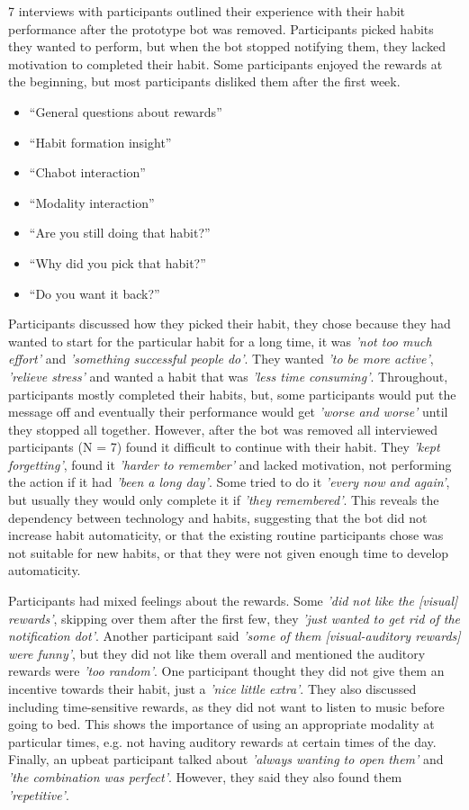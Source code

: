 7 interviews with participants outlined their experience with their habit performance after the prototype bot was removed. Participants picked habits they wanted to perform, but when the bot stopped notifying them, they lacked motivation to completed their habit. Some participants enjoyed the rewards at the beginning, but most participants disliked them after the first week.

\begin{itemize}
  \item ``General questions about rewards''
  \item ``Habit formation insight''
  \item ``Chabot interaction''
  \item ``Modality interaction''
  \item ``Are you still doing that habit?''
  \item ``Why did you pick that habit?''
  \item ``Do you want it back?''
\end{itemize}


Participants discussed how they picked their habit, they chose because they had wanted to start for the particular habit for a long time, it was \textit{'not too much effort'} and \textit{'something successful people do'}. They wanted \textit{'to be more active'}, \textit{'relieve stress'} and wanted a habit that was \textit{'less time consuming'}. Throughout, participants mostly completed their habits, but, some participants would put the message off and eventually their performance would get \textit{'worse and worse'} until they stopped all together. However, after the bot was removed all interviewed participants (N = 7) found it difficult to continue with their habit. They \textit{'kept forgetting'}, found it \textit{'harder to remember'} and lacked motivation, not performing the action if it had \textit{'been a long day'}. Some tried to do it \textit{'every now and again'}, but usually they would only complete it if \textit{'they remembered'}. This reveals the dependency between technology and habits, suggesting that the bot did not increase habit automaticity, or that the existing routine participants chose was not suitable for new habits, or that they were not given enough time to develop automaticity.

Participants had mixed feelings about the rewards. Some \textit{'did not like the [visual] rewards'}, skipping over them after the first few, they \textit{'just wanted to get rid of the notification dot'}. Another participant said \textit{'some of them [visual-auditory rewards] were funny'}, but they did not like them overall and mentioned the auditory rewards were \textit{'too random'}. One participant thought they did not give them an incentive towards their habit, just a \textit{'nice little extra'}. They also discussed including time-sensitive rewards, as they did not want to listen to music before going to bed. This shows the importance of using an appropriate modality at particular times, e.g. not having auditory rewards at certain times of the day. Finally, an upbeat participant talked about \textit{'always wanting to open them'} and \textit{'the combination was perfect'}. However, they said they also found them \textit{'repetitive'}.



